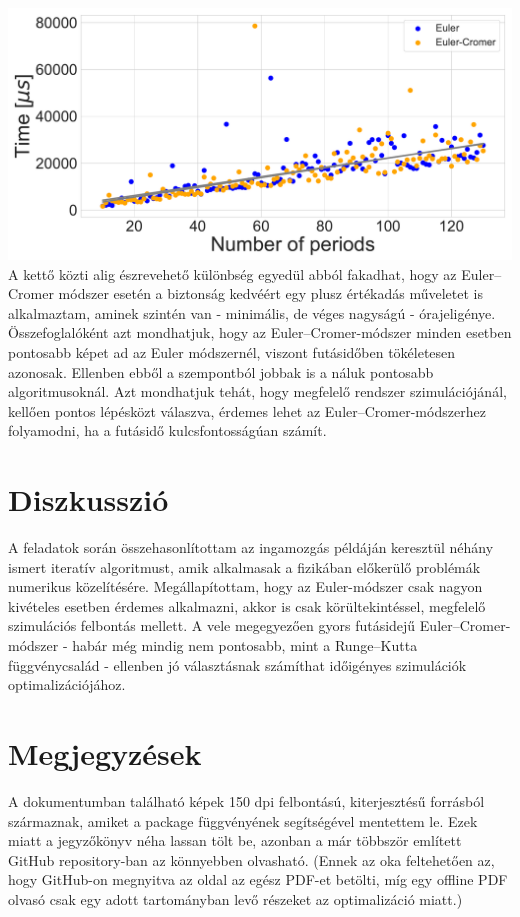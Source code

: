 \begin{multicols}{2}
\hfill \break \hfill \break
{\centering\includegraphics[width=.5\textwidth]{images/runtime_all_both.pdf}}
\hfill \break
A kettő közti alig észrevehető különbség egyedül abból fakadhat, hogy az Euler--Cromer módszer esetén a biztonság kedvéért egy plusz értékadás műveletet is alkalmaztam, aminek szintén van - minimális, de véges nagyságú - órajeligénye. \\
Összefoglalóként azt mondhatjuk, hogy az Euler--Cromer-módszer minden esetben pontosabb képet ad az Euler módszernél, viszont futásidőben tökéletesen azonosak. Ellenben ebből a szempontból jobbak is a náluk pontosabb algoritmusoknál. Azt mondhatjuk tehát, hogy megfelelő rendszer szimulációjánál, kellően pontos lépésközt válaszva, érdemes lehet az Euler--Cromer-módszerhez folyamodni, ha a futásidő kulcsfontosságúan számít.

\section{Diszkusszió} \label{sec:5}
A feladatok során összehasonlítottam az ingamozgás példáján keresztül néhány ismert iteratív algoritmust, amik alkalmasak a fizikában előkerülő problémák numerikus közelítésére. Megállapítottam, hogy az Euler-módszer csak nagyon kivételes esetben érdemes alkalmazni, akkor is csak körültekintéssel, megfelelő szimulációs felbontás mellett. A vele megegyezően gyors futásidejű Euler--Cromer-módszer - habár még mindig nem pontosabb, mint a Runge--Kutta függvénycsalád - ellenben jó választásnak számíthat időigényes szimulációk optimalizációjához. \\



\section{Megjegyzések} \label{sec:6}
A dokumentumban található képek 150 dpi felbontású,  kiterjesztésű forrásból származnak, amiket a  package  függvényének segítségével mentettem le. Ezek miatt a jegyzőkönyv néha lassan tölt be, azonban a már többször említett GitHub repository-ban az könnyebben olvasható. (Ennek az oka feltehetően az, hogy GitHub-on megnyitva az oldal az egész PDF-et betölti, míg egy offline PDF olvasó csak egy adott tartományban levő részeket az optimalizáció miatt.) \\

\end{multicols}